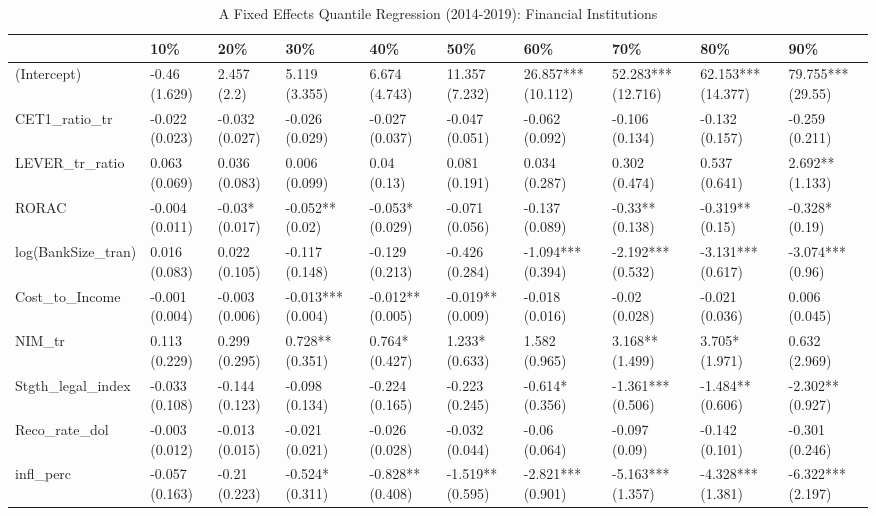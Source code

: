 \begin{table}[ht]
\centering
\caption{A Fixed Effects Quantile Regression (2014-2019): Financial Institutions} 
\begingroup\small
\begin{tabular}{llllllllll}
  \toprule
 & 10\% & 20\% & 30\% & 40\% & 50\% & 60\% & 70\% & 80\% & 90\% \\ 
  \midrule
(Intercept) & -0.46 (1.629) & 2.457 (2.2) & 5.119 (3.355) & 6.674 (4.743) & 11.357 (7.232) & 26.857*** (10.112) & 52.283*** (12.716) & 62.153*** (14.377) & 79.755*** (29.55) \\ 
  CET1\_ratio\_tr & -0.022 (0.023) & -0.032 (0.027) & -0.026 (0.029) & -0.027 (0.037) & -0.047 (0.051) & -0.062 (0.092) & -0.106 (0.134) & -0.132 (0.157) & -0.259 (0.211) \\ 
  LEVER\_tr\_ratio & 0.063 (0.069) & 0.036 (0.083) & 0.006 (0.099) & 0.04 (0.13) & 0.081 (0.191) & 0.034 (0.287) & 0.302 (0.474) & 0.537 (0.641) & 2.692** (1.133) \\ 
  RORAC & -0.004 (0.011) & -0.03* (0.017) & -0.052** (0.02) & -0.053* (0.029) & -0.071 (0.056) & -0.137 (0.089) & -0.33** (0.138) & -0.319** (0.15) & -0.328* (0.19) \\ 
  log(BankSize\_tran) & 0.016 (0.083) & 0.022 (0.105) & -0.117 (0.148) & -0.129 (0.213) & -0.426 (0.284) & -1.094*** (0.394) & -2.192*** (0.532) & -3.131*** (0.617) & -3.074*** (0.96) \\ 
  Cost\_to\_Income & -0.001 (0.004) & -0.003 (0.006) & -0.013*** (0.004) & -0.012** (0.005) & -0.019** (0.009) & -0.018 (0.016) & -0.02 (0.028) & -0.021 (0.036) & 0.006 (0.045) \\ 
  NIM\_tr & 0.113 (0.229) & 0.299 (0.295) & 0.728** (0.351) & 0.764* (0.427) & 1.233* (0.633) & 1.582 (0.965) & 3.168** (1.499) & 3.705* (1.971) & 0.632 (2.969) \\ 
  Stgth\_legal\_index & -0.033 (0.108) & -0.144 (0.123) & -0.098 (0.134) & -0.224 (0.165) & -0.223 (0.245) & -0.614* (0.356) & -1.361*** (0.506) & -1.484** (0.606) & -2.302** (0.927) \\ 
  Reco\_rate\_dol & -0.003 (0.012) & -0.013 (0.015) & -0.021 (0.021) & -0.026 (0.028) & -0.032 (0.044) & -0.06 (0.064) & -0.097 (0.09) & -0.142 (0.101) & -0.301 (0.246) \\ 
  infl\_perc & -0.057 (0.163) & -0.21 (0.223) & -0.524* (0.311) & -0.828** (0.408) & -1.519** (0.595) & -2.821*** (0.901) & -5.163*** (1.357) & -4.328*** (1.381) & -6.322*** (2.197) \\ 

\end{tabular}
\end{table}
